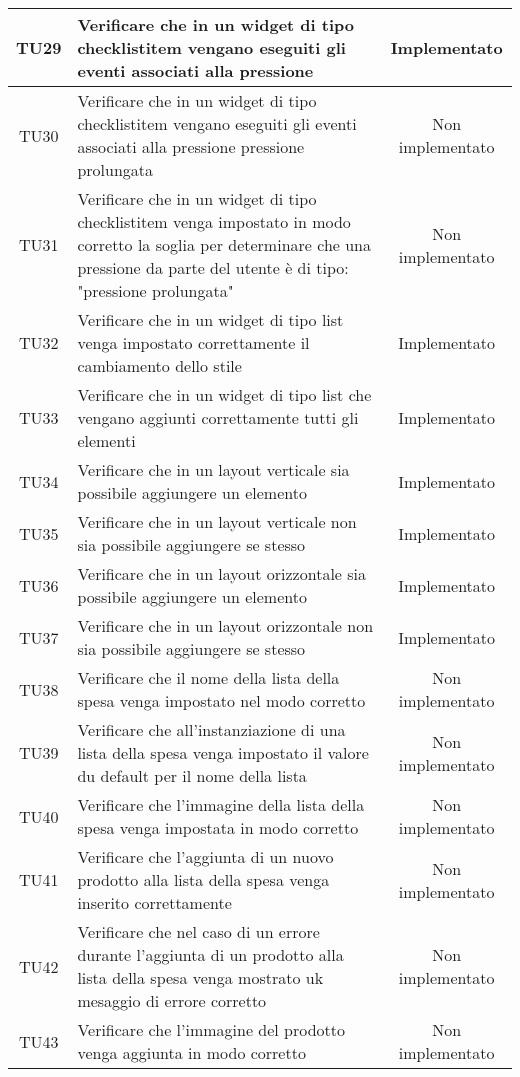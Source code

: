 \begin{center}
\begin{longtable}{|c|>{\centering}m{10cm}|c|}
		TU29 & Verificare che in un widget di tipo checklistitem vengano eseguiti gli eventi associati alla pressione & Implementato \\ \hline
		TU30 & Verificare che in un widget di tipo checklistitem vengano eseguiti gli eventi associati alla pressione pressione prolungata & Non implementato \\ \hline
		TU31 & Verificare che in un widget di tipo checklistitem venga impostato in modo corretto la soglia per determinare che una pressione da parte del utente è di tipo: "pressione prolungata" & Non implementato \\ \hline
		TU32 & Verificare che in un widget di tipo list venga impostato correttamente il cambiamento dello stile & Implementato \\ \hline
		TU33 & Verificare che in un widget di tipo list che vengano aggiunti correttamente tutti gli elementi & Implementato \\ \hline
		TU34 & Verificare che in un layout verticale sia possibile aggiungere un elemento & Implementato \\ \hline
		TU35 & Verificare che in un layout verticale non sia possibile aggiungere se stesso & Implementato \\ \hline
		TU36 & Verificare che in un layout orizzontale sia possibile aggiungere un elemento & Implementato \\ \hline
		TU37 & Verificare che in un layout orizzontale non sia possibile aggiungere se stesso & Implementato \\ \hline
		TU38 & Verificare che il nome della lista della spesa venga impostato nel modo corretto & Non implementato \\ \hline
		TU39 & Verificare che all'instanziazione di una lista della spesa venga impostato il valore du default per il nome della lista & Non implementato \\ \hline
		TU40 & Verificare che l'immagine della lista della spesa venga impostata in modo corretto & Non implementato \\ \hline
		TU41 & Verificare che l'aggiunta di un nuovo prodotto alla lista della spesa venga inserito correttamente & Non implementato \\ \hline
		TU42 & Verificare che nel caso di un errore durante l'aggiunta di un prodotto alla lista della spesa venga mostrato uk mesaggio di errore corretto & Non implementato \\ \hline
		TU43 & Verificare che l'immagine del prodotto venga aggiunta in modo corretto & Non implementato \\ \hline

\end{longtable}
\end{center}
